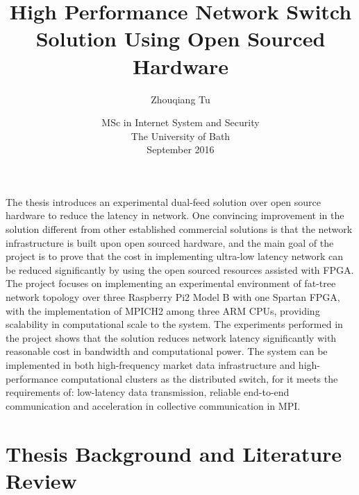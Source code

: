 \documentclass[11pt,openright,a4paper]{report}
\title{High Performance Network Switch Solution Using Open Sourced Hardware}
\author{Zhouqiang Tu}
\date{MSc in Internet System and Security\\The University of Bath\\September 2016}
\begin{document}
\lstset{language=Java,breaklines,breakatwhitespace,basicstyle=\small}


\setcounter{page}{0}


\maketitle
\newpage


\newpage


\newpage


\abstract
The thesis introduces an experimental dual-feed solution over open source hardware to reduce the latency in network. One convincing improvement in the solution different from other established commercial solutions is that the network infrastructure is built upon open sourced hardware, and the main goal of the project is to prove that the cost in implementing ultra-low latency network can be reduced significantly by using the open sourced resources assisted with FPGA. The project focuses on implementing an experimental environment of fat-tree network topology over three Raspberry Pi2 Model B with one Spartan FPGA, with the implementation of MPICH2 among three ARM CPUs, providing scalability in computational scale to the system. The experiments performed in the project shows that the solution reduces network latency significantly with reasonable cost in bandwidth and computational power. The system can be implemented in both high-frequency market data infrastructure and high-performance computational clusters as the distributed switch, for it meets the requirements of: low-latency data transmission, reliable end-to-end communication and acceleration in collective communication in MPI.  
\newpage

\tableofcontents
\newpage
\listoffigures
\newpage
\listoftables
\newpage

\setcounter{page}{1}



\chapter{Thesis Background and Literature Review}
\end{document}
